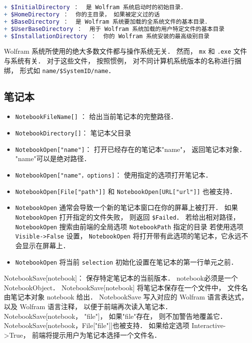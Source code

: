 \begin{lstlisting}[language=mathematica]
+ $InitialDirectory ：  是 Wolfram 系统启动时的初始目录．
+ $HomeDirectory ：  你的主目录， 如果被定义过的话
+ $BaseDirectory ：  是 Wolfram 系统要加载的全系统文件的基本目录．
+ $UserBaseDirectory ：  用于 Wolfram 系统加载的用户特定文件的基本目录
+ $InstallationDirectory ：  你的 Wolfram 系统安装的最高级别目录
\end{lstlisting}

Wolfram 系统所使用的绝大多数文件都与操作系统无关． 然而， \verb`mx` 和 \verb`.exe` 文件与系统有关．
对于这些文件， 按照惯例， 对不同计算机系统版本的名称进行捆绑， 形式如 \verb`name/$SystemID/name`．

\subsection{笔记本}

\begin{itemize}
\item \verb`NotebookFileName[]` ： 给出当前笔记本的完整路径．
\item \verb`NotebookDirectory[]`： 笔记本父目录
\end{itemize}


\begin{itemize}
\item \verb`NotebookOpen["name"]`：  打开已经存在的笔记本"name"， 返回笔记本对象． "name"可以是绝对路径．
\item \verb`NotebookOpen["name"，options]`： 使用指定的选项打开笔记本．
\item \verb`NotebookOpen[File["path"]]` 和 \verb`NotebookOpen[URL["url"]]` 也被支持．
\item \verb`NotebookOpen` 通常会导致一个新的笔记本窗口在你的屏幕上被打开．
如果 \verb`NotebookOpen` 打开指定的文件失败， 则返回 \verb`$Failed`．
若给出相对路径， \verb`NotebookOpen` 搜索由前端的全局选项 \verb`NotebookPath` 指定的目录
若使用选项 \verb`Visible->False` 设置， \verb`NotebookOpen` 将打开带有此选项的笔记本，它永远不会显示在屏幕上．
\item \verb`NotebookOpen` 将当前 \verb`selection` 初始化设置在笔记本的第一行单元之前．

\end{itemize}



NotebookSave[notebook]： 保存特定笔记本的当前版本．
    notebook必须是一个NotebookObject．
    NotebookSave[notebook] 将笔记本保存在一个文件中， 文件名由笔记本对象 notebook 给出．
    NotebookSave 写入对应的 Wolfram 语言表达式， 以及 Wolfram 语言注释， 以便于前端再次读入笔记本．
    NotebookSave[notebook， "file"]， 如果"file"存在， 则不加警告地覆盖它．
    NotebookSave[notebook，File["file"]]也被支持．
    如果给定选项 Interactive->True， 前端将提示用户为笔记本选择一个文件名．

